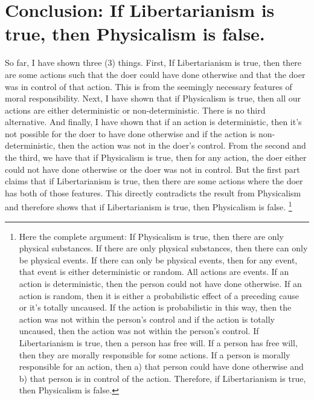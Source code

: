 \section{Conclusion: If Libertarianism is true, then Physicalism is false.}

So far, I have shown three (3) things. First, If Libertarianism is true, then there are some actions such that the doer could have done otherwise and that the doer was in control of that action. This is from the seemingly necessary features of moral responsibility. Next, I have shown that if Physicalism is true, then all our actions are either deterministic or non-deterministic. There is no third alternative. And finally, I have shown that if an action is deterministic, then it's not possible for the doer to have done otherwise and if the action is non-deterministic, then the action was not in the doer's control. From the second and the third, we have that if Physicalism is true, then for any action, the doer either could not have done otherwise or the doer was not in control. But the first part claims that if Libertarianism is true, then there are some actions where the doer has both of those features. This directly contradicts the result from Physicalism and therefore shows that if Libertarianism is true, then Physicalism is false. \footnote{Here the complete argument: If Physicalism is true, then there are only physical substances. If there are only physical substances, then there can only be physical events. If there can only be physical events, then for any event, that event is either deterministic or random. All actions are events. If an action is deterministic, then the person could not have done otherwise. If an action is random, then it is either a probabilistic effect of a preceding cause or it’s totally uncaused. If the action is probabilistic in this way, then the action was not within the person’s control and if the action is totally uncaused, then the action was not within the person’s control. If Libertarianism is true, then a person has free will. If a person has free will, then they are morally responsible for some actions. If a person is morally responsible for an action, then a) that person could have done otherwise and b) that person is in control of the action. Therefore, if Libertarianism is true, then Physicalism is false.}

